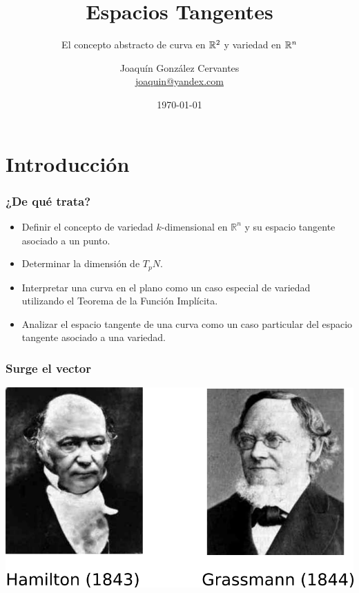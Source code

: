 \documentclass[spanish]{beamer}
\title[Espacios Tangentes]{
    Espacios Tangentes}
\subtitle{El concepto abstracto de curva en $\realR^{2}$ y variedad en $\realR^{n}$}
\author[Joaquín González Cervantes]{
  Joaquín González Cervantes \\\medskip
  {\small \url{joaquin@yandex.com}}}
\institute[Universidad de Guadalajara]{}
\date[\today]{
   \today}
\def\realR{\mathbb{R}} %
\begin{document}
\begin{frame}
  \titlepage
\end{frame}

\section{Introducción}

\begin{frame}
\frametitle{¿De qué trata?}

  \begin{block}{}
    \begin{itemize}
        \item Definir el concepto de variedad $k$-dimensional en $\realR^{n}$ y su espacio tangente asociado a un punto.
        \item Determinar la dimensi\'on de $T_{p}N$.
        \item Interpretar una curva en el plano como un caso especial de variedad utilizando el Teorema de la Funci\'on Impl\'icita.
        \item Analizar el espacio tangente de una curva como un caso particular del espacio tangente asociado a una variedad.
    \end{itemize}
  \end{block}
\end{frame}

\begin{frame}
    \frametitle{Surge el vector}
    \includegraphics[width=\textwidth]{../gfx/hamilton-grassmann}
\end{frame}
\end{document}
